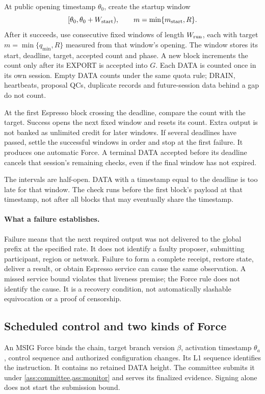 \documentclass[11pt,a4paper]{article}
\begin{document}
At public opening timestamp $\theta_0$, create the startup window
\[
 [\theta_0,\theta_0+W_{\rm start}),\qquad
 m=\min\{m_{\rm start},R\}.
\]
After it succeeds, use consecutive fixed windows of length
$W_{\rm run}$, each with target $m=\min\{q_{\min},R\}$ measured from
that window's opening. The window stores its start, deadline, target,
accepted count and phase. A new block increments the count only after
its EXPORT is accepted into $G$. Each DATA is counted once in its own
session. Empty DATA counts under the same quota rule; DRAIN, heartbeats,
proposal QCs, duplicate records and future-session data behind a gap
do not count.

At the first Espresso block crossing the deadline, compare the count
with the target. Success opens the next fixed window and resets its
count. Extra output is not banked as unlimited credit for later windows.
If several deadlines have passed, settle the successful windows in
order and stop at the first failure. It produces one automatic Force.
A terminal DATA accepted before its deadline cancels that session's
remaining checks, even if the final window has not expired.

The intervals are half-open. DATA with a timestamp equal to the
deadline is too late for that window. The check runs before the first
block's payload at that timestamp, not after all blocks that may
eventually share the timestamp.

\paragraph{What a failure establishes.}
Failure means that the next required output was not delivered to the
global prefix at the specified rate. It does not identify a faulty
proposer, submitting participant, region or network. Failure to form a
complete receipt, restore state, deliver a result, or obtain Espresso
service can cause the same observation. A missed service bound violates
that liveness premise; the Force rule does not identify the cause. It is a recovery condition,
not automatically slashable equivocation or a proof of censorship.

\subsection{Scheduled control and two kinds of Force}
\label{sec:force-stages}
An MSIG Force binds the chain, target branch version $\beta$, activation
timestamp $\theta_a$, control sequence and authorized configuration
changes. Its L1 sequence identifies the instruction. It contains no
retained DATA height. The committee submits it under
\cref{ass:committee,ass:monitor} and serves its finalized evidence.
Signing alone does not start the submission bound.
\end{document}
